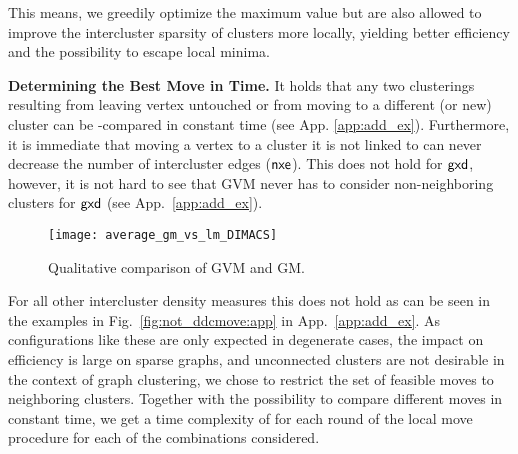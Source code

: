 \documentclass{llncs}
\newcommand{\measure}[1]{\ensuremath{\text{\normalfont{\sffamily {#1}}}}\xspace}
\newcommand{\andreapar}{\vspace*{.5ex}\par\noindent}
\begin{document}
This means, we greedily optimize the maximum value but are also allowed to improve the intercluster sparsity of clusters more locally, yielding better efficiency and the possibility to escape local minima.
\andreapar\textbf{Determining the Best Move in  Time.}
It holds that any two clusterings resulting from leaving vertex  untouched or from moving  to a different (or new) cluster can be -compared in constant time (see App. \ref{app:add_ex}).
Furthermore, it is immediate that moving a vertex to a cluster it is not linked to can never decrease the number of intercluster edges (\measure{nxe}).
This does not hold for \measure{gxd}, however, it is not hard to see that GVM never has to consider non-neighboring clusters for \measure{gxd} (see App.~\ref{app:add_ex}).
\begin{figure}
 	\centerline{\texttt{[image: average\_gm\_vs\_lm\_DIMACS]}}
	\vspace{-1.5ex}
 	\caption{Qualitative comparison of GVM and GM.}
 	\label{fig:LM_vs_MOVE}
\end{figure}
For all other intercluster density measures this does not hold as can be seen in the examples in Fig.~\ref{fig:not_ddcmove:app} in App.~\ref{app:add_ex}. As configurations like these are only expected in degenerate cases, the impact on efficiency is large on sparse graphs, and unconnected clusters are not desirable in the context of graph clustering, we chose to restrict the set of feasible moves to neighboring clusters.
Together with the possibility to compare different moves in constant time, we get a time complexity of  for each round of the local move procedure for each of the combinations considered.
\end{document}
